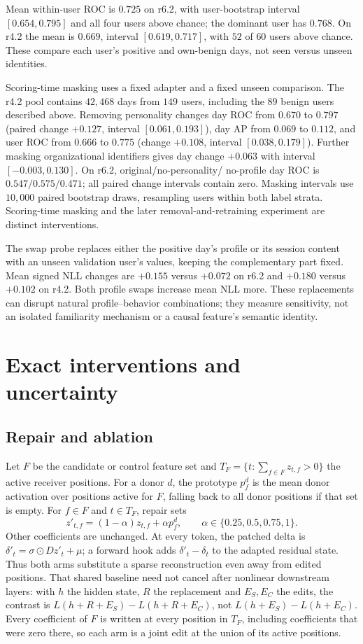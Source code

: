Mean within-user ROC is $0.725$ on r6.2, with user-bootstrap interval
$[0.654,0.795]$ and all four users above chance; the dominant user has
$0.768$. On r4.2 the mean is $0.669$, interval $[0.619,0.717]$,
with $52$ of $60$ users above chance. These compare each user's
positive and own-benign days, not seen versus unseen identities.

Scoring-time masking uses a fixed adapter and a fixed unseen comparison.
The r4.2 pool contains $42{,}468$ days from $149$ users, including the
$89$ benign users described above. Removing personality changes day
ROC from $0.670$ to $0.797$ (paired change $+0.127$, interval
$[0.061,0.193]$), day AP from $0.069$ to $0.112$, and user ROC
from $0.666$ to $0.775$ (change $+0.108$, interval $[0.038,0.179]$).
Further masking organizational identifiers gives day change $+0.063$
with interval $[-0.003,0.130]$. On r6.2, original/no-personality/
no-profile day ROC is $0.547/0.575/0.471$; all paired change intervals
contain zero. Masking intervals use $10{,}000$ paired bootstrap draws,
resampling users within both label strata. Scoring-time masking and
the later removal-and-retraining experiment are distinct interventions.

The swap probe replaces either the positive day's profile or its session
content with an unseen validation user's values, keeping the complementary
part fixed. Mean signed NLL changes are $+0.155$ versus $+0.072$ on
r6.2 and $+0.180$ versus $+0.102$ on r4.2. Both profile swaps
increase mean NLL more. These replacements can disrupt natural
profile--behavior combinations; they measure sensitivity, not an
isolated familiarity mechanism or a causal feature's semantic identity.

\section{Exact interventions and uncertainty}
\label{app:intervention}

\subsection{Repair and ablation}

Let $F$ be the candidate or control feature set and
$T_F=\{t:\sum_{f\in F}z_{t,f}>0\}$ the active receiver positions.
For a donor $d$, the prototype $p_f^d$ is the mean donor activation
over positions active for $F$, falling back to all donor positions if
that set is empty. For $f\in F$ and $t\in T_F$, repair sets
\[
 z'_{t,f}=(1-\alpha)z_{t,f}+\alpha p_f^d,
 \qquad \alpha\in\{0.25,0.5,0.75,1\}.
\]
Other coefficients are unchanged. At every token, the patched delta is
$\delta'_t=\sigma\odot Dz'_t+\mu$; a forward hook adds
$\delta'_t-\delta_t$ to the adapted residual state. Thus both arms
substitute a sparse reconstruction even away from edited positions.
That shared baseline need not cancel after nonlinear downstream layers:
with $h$ the hidden state, $R$ the replacement and $E_S,E_C$ the edits, the
contrast is $L(h{+}R{+}E_S)-L(h{+}R{+}E_C)$, not $L(h{+}E_S)-L(h{+}E_C)$.
Every coefficient of $F$ is written at every position in $T_F$, including
coefficients that were zero there, so each arm is a joint edit at the union
of its active positions.

